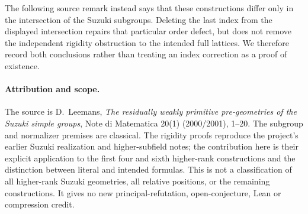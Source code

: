 \documentclass[11pt,a4paper]{article}
\begin{document}
The following source remark instead says that these constructions differ
only in the intersection of the Suzuki subgroups. Deleting the last index
from the displayed intersection repairs that particular order defect,
but does not remove the independent rigidity obstruction to the intended
full lattices. We therefore record both conclusions rather than treating
an index correction as a proof of existence.

\paragraph{Attribution and scope.}
The source is D.~Leemans, \emph{The residually weakly primitive
pre-geometries of the Suzuki simple groups}, Note di Matematica 20(1)
(2000/2001), 1--20. The subgroup and normalizer premises are classical.
The rigidity proofs reproduce the project's earlier Suzuki realization
and higher-subfield notes; the contribution here is their explicit
application to the first four and sixth higher-rank constructions and
the distinction between literal and intended formulas.
This is not a classification of all higher-rank Suzuki geometries,
all relative positions, or the remaining constructions. It gives no
new principal-refutation, open-conjecture, Lean or compression credit.
\end{document}
